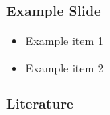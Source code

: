 \documentclass{beamer}
\begin{document}
\begin{frame}
  \titlepage
\end{frame}

\begin{frame}
  \frametitle{Example Slide}
  \begin{itemize}
    \item Example item 1
    \item Example item 2
  \end{itemize}
  \nocite{agudelo-toro2013Comput}
\end{frame}

\begin{frame}[t,allowframebreaks]
  \frametitle{Literature}
  \printbibliography
\end{frame}
\end{document}
